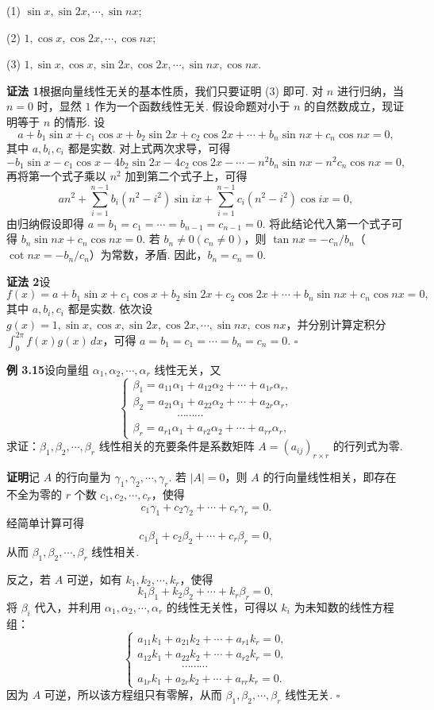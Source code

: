 \documentclass[UTF8, 12pt, fontset=fandol, oneside]{ctexart}
\begin{document}
(1) $\sin x,\sin 2x,\cdots,\sin nx$;

(2) $1,\cos x,\cos 2x,\cdots,\cos nx$;

(3) $1,\sin x,\cos x,\sin 2x,\cos 2x,\cdots,\sin nx,\cos nx$.

\noindent\textbf{证法 1}\quad 根据向量线性无关的基本性质，我们只要证明 (3) 即可. 对 $n$ 进行归纳，当 $n=0$ 时，显然 $1$ 作为一个函数线性无关. 假设命题对小于 $n$ 的自然数成立，现证明等于 $n$ 的情形. 设
\[
a+b_1\sin x+c_1\cos x+b_2\sin 2x+c_2\cos 2x+\cdots+b_n\sin nx+c_n\cos nx=0,
\]
其中 $a,b_i,c_i$ 都是实数. 对上式两次求导，可得
\[
-b_1\sin x-c_1\cos x-4b_2\sin 2x-4c_2\cos 2x-\cdots-n^2b_n\sin nx-n^2c_n\cos nx=0,
\]
再将第一个式子乘以 $n^2$ 加到第二个式子上，可得
\[
an^2+\sum_{i=1}^{n-1}b_i(n^2-i^2)\sin ix+\sum_{i=1}^{n-1}c_i(n^2-i^2)\cos ix=0,
\]
由归纳假设即得 $a=b_1=c_1=\cdots=b_{n-1}=c_{n-1}=0$. 将此结论代入第一个式子可得 $b_n\sin nx+c_n\cos nx=0$. 若 $b_n\ne 0(c_n\ne 0)$，则 $\tan nx=-c_n/b_n$（$\cot nx=-b_n/c_n$）为常数，矛盾. 因此，$b_n=c_n=0$.

\noindent\textbf{证法 2}\quad 设
\[
f(x)=a+b_1\sin x+c_1\cos x+b_2\sin 2x+c_2\cos 2x+\cdots+b_n\sin nx+c_n\cos nx=0,
\]
其中 $a,b_i,c_i$ 都是实数. 依次设 $g(x)=1,\sin x,\cos x,\sin 2x,\cos 2x,\cdots,\sin nx,\cos nx$，并分别计算定积分 $\int_0^{2\pi}f(x)g(x)\,dx$，可得 $a=b_1=c_1=\cdots=b_n=c_n=0$. $\square$

\noindent\textbf{例 3.15}\quad 设向量组 $\alpha_1,\alpha_2,\cdots,\alpha_r$ 线性无关，又
\[
\left\{
\begin{array}{l}
\beta_1=a_{11}\alpha_1+a_{12}\alpha_2+\cdots+a_{1r}\alpha_r,\\
\beta_2=a_{21}\alpha_1+a_{22}\alpha_2+\cdots+a_{2r}\alpha_r,\\
\hspace{4em}\cdots\cdots\cdots\\
\beta_r=a_{r1}\alpha_1+a_{r2}\alpha_2+\cdots+a_{rr}\alpha_r,
\end{array}
\right.
\]
求证：$\beta_1,\beta_2,\cdots,\beta_r$ 线性相关的充要条件是系数矩阵 $A=(a_{ij})_{r\times r}$ 的行列式为零.

\noindent\textbf{证明}\quad 记 $A$ 的行向量为 $\gamma_1,\gamma_2,\cdots,\gamma_r$. 若 $|A|=0$，则 $A$ 的行向量线性相关，即存在不全为零的 $r$ 个数 $c_1,c_2,\cdots,c_r$，使得
\[
c_1\gamma_1+c_2\gamma_2+\cdots+c_r\gamma_r=0.
\]
经简单计算可得
\[
c_1\beta_1+c_2\beta_2+\cdots+c_r\beta_r=0,
\]
从而 $\beta_1,\beta_2,\cdots,\beta_r$ 线性相关.

反之，若 $A$ 可逆，如有 $k_1,k_2,\cdots,k_r$，使得
\[
k_1\beta_1+k_2\beta_2+\cdots+k_r\beta_r=0,
\]
将 $\beta_i$ 代入，并利用 $\alpha_1,\alpha_2,\cdots,\alpha_r$ 的线性无关性，可得以 $k_i$ 为未知数的线性方程组：
\[
\left\{
\begin{array}{l}
a_{11}k_1+a_{21}k_2+\cdots+a_{r1}k_r=0,\\
a_{12}k_1+a_{22}k_2+\cdots+a_{r2}k_r=0,\\
\hspace{4em}\cdots\cdots\cdots\\
a_{1r}k_1+a_{2r}k_2+\cdots+a_{rr}k_r=0.
\end{array}
\right.
\]
因为 $A$ 可逆，所以该方程组只有零解，从而 $\beta_1,\beta_2,\cdots,\beta_r$ 线性无关. $\square$
\end{document}
